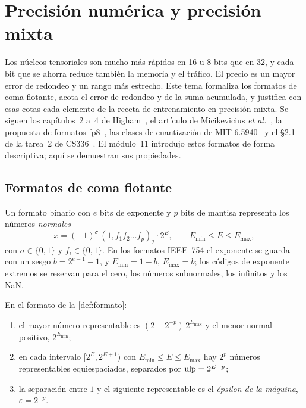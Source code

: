 \chapter{Precisión numérica y precisión mixta}
\label{tema:4}

Los núcleos tensoriales son mucho más rápidos en 16 u 8 bits que en 32, y cada bit que se ahorra reduce también la memoria y el tráfico. El precio es un mayor error de redondeo y un rango más estrecho. Este tema formaliza los formatos de coma flotante, acota el error de redondeo y de la suma acumulada, y justifica con esas cotas cada elemento de la receta de entrenamiento en precisión mixta. Se siguen los capítulos~2 a~4 de Higham~\cite{higham}, el artículo de Micikevicius \emph{et al.}~\cite[§3]{micikevicius}, la propuesta de formatos fp8~\cite{fp8}, las clases de cuantización de MIT 6.5940~\cite{mit65940} y el §2.1 de la tarea~2 de CS336~\cite{cs336a2}. El módulo~11 introdujo estos formatos de forma descriptiva; aquí se demuestran sus propiedades.

\section{Formatos de coma flotante}

\begin{definicion}\label{def:formato}
Un formato binario con $e$ bits de exponente y $p$ bits de mantisa representa los números \emph{normales}
\[
x=(-1)^{\sigma}\,(1{,}f_1f_2\dots f_p)_2\cdot 2^{E},\qquad E_{\min}\le E\le E_{\max},
\]
con $\sigma\in\{0,1\}$ y $f_i\in\{0,1\}$. En los formatos IEEE~754 el exponente se guarda con un sesgo $b=2^{e-1}-1$, y $E_{\min}=1-b$, $E_{\max}=b$; los códigos de exponente extremos se reservan para el cero, los números subnormales, los infinitos y los NaN.
\end{definicion}

\begin{proposicion}\label{prop:rango}
En el formato de la \cref{def:formato}:
\begin{enumerate}
  \item el mayor número representable es $(2-2^{-p})\,2^{E_{\max}}$ y el menor normal positivo, $2^{E_{\min}}$;
  \item en cada intervalo $[2^{E},2^{E+1})$ con $E_{\min}\le E\le E_{\max}$ hay $2^{p}$ números representables equiespaciados, separados por $\operatorname{ulp}=2^{E-p}$;
  \item la separación entre $1$ y el siguiente representable es el \emph{épsilon de la máquina}, $\varepsilon=2^{-p}$.
\end{enumerate}
\end{proposicion}

